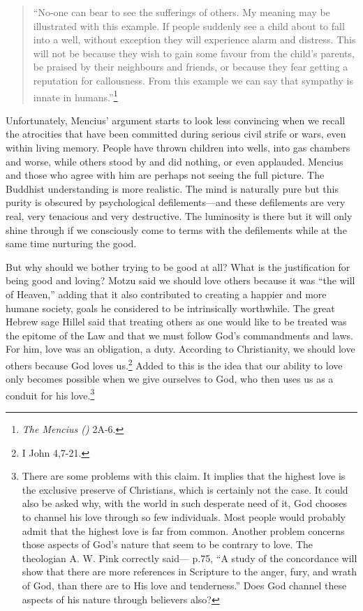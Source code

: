 \documentclass[10pt, openright]{book}
\begin{document}
\begin{quote}

\hspace{-0.4em}“No-one can bear to see the sufferings of others. My meaning may be illustrated with this example. If people suddenly see a child about to fall into a well, without exception they will experience alarm and distress. This will not be because they wish to gain some favour from the child’s parents, be praised by their neighbours and friends, or because they fear getting a reputation for callousness. From this example we can say that sympathy is innate in humans.”\footnote {\textit{The Mencius (\cite{Mencius 1970a})} 2A-6.}


\end{quote}
Unfortunately, Mencius’ argument starts to look less convincing when we recall the atrocities that have been committed during serious civil strife or wars, even within living memory. People have thrown children into wells, into gas chambers and worse, while others stood by and did nothing, or even applauded. Mencius and those who agree with him are perhaps not seeing the full picture. The Buddhist understanding is more realistic. The mind is naturally pure but this purity is obscured by psychological defilements—and these defilements are very real, very tenacious and very destructive. The luminosity is there but it will only shine through if we consciously come to terms with the defilements while at the same time nurturing the good.


But why should we bother trying to be good at all? What is the justification for being good and loving? Motzu said we should love others because it was “the will of Heaven,” adding that it also contributed to creating a happier and more humane society, goals he considered to be intrinsically worthwhile. The great Hebrew sage Hillel said that treating others as one would like to be treated was the epitome of the Law and that we must follow God’s commandments and laws. For him, love was an obligation, a duty. According to Christianity, we should love others because God loves us.\footnote {I John 4,7-21.} Added to this is the idea that our ability to love only becomes possible when we give ourselves to God, who then uses us as a conduit for his love.\footnote {There are some problems with this claim. It implies that the highest love is the exclusive preserve of Christians, which is certainly not the case. It could also be asked why, with the world in such desperate need of it, God chooses to channel his love through so few individuals. Most people would probably admit that the highest love is far from common. Another problem concerns those aspects of God’s nature that seem to be contrary to love. The theologian A. W. Pink correctly said—\cite{Pink 1968} p.75, “A study of the concordance will show that there are more references in Scripture to the anger, fury, and wrath of God, than there are to His love and tenderness.” Does God channel these aspects of his nature through believers also?}
\end{document}
